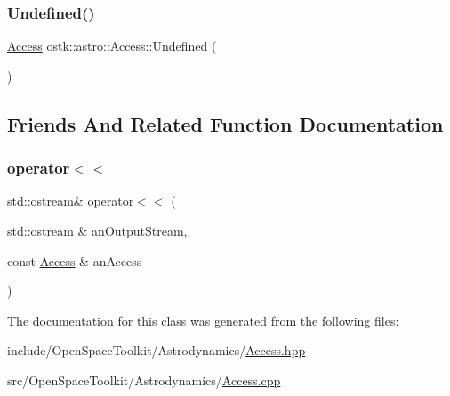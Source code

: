 \subsubsection{\texorpdfstring{Undefined()}{Undefined()}}
{\footnotesize\ttfamily \hyperlink{classostk_1_1astro_1_1_access}{Access} ostk\+::astro\+::\+Access\+::\+Undefined (\begin{DoxyParamCaption}{ }\end{DoxyParamCaption})\hspace{0.3cm}{\ttfamily [static]}}



\subsection{Friends And Related Function Documentation}
\mbox{\label{classostk_1_1astro_1_1_access_a84eabd1ef8d3eeff0b6a80851727a2b4}} 
\subsubsection{\texorpdfstring{operator$<$$<$}{operator<<}}
{\footnotesize\ttfamily std\+::ostream\& operator$<$$<$ (\begin{DoxyParamCaption}\item[{std\+::ostream \&}]{an\+Output\+Stream,  }\item[{const \hyperlink{classostk_1_1astro_1_1_access}{Access} \&}]{an\+Access }\end{DoxyParamCaption})\hspace{0.3cm}{\ttfamily [friend]}}



The documentation for this class was generated from the following files\+:\begin{DoxyCompactItemize}
\item 
include/\+Open\+Space\+Toolkit/\+Astrodynamics/\hyperlink{_access_8hpp}{Access.\+hpp}\item 
src/\+Open\+Space\+Toolkit/\+Astrodynamics/\hyperlink{_access_8cpp}{Access.\+cpp}\end{DoxyCompactItemize}
